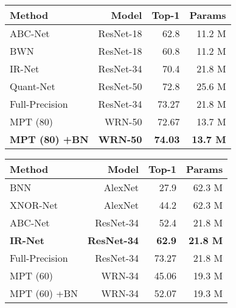 \documentclass{article} \usepackage{iclr2021_conference,times}
\begin{document}
\begin{table*}[h] 
\parbox{.45\linewidth}{
\centering
\begin{small}
\begin{tabular}{@{}lrrr@{}}\toprule
\textbf{Method} & \textbf{Model} & \textbf{Top-1} & \textbf{Params} \\ \midrule
ABC-Net & ResNet-18 & 62.8 & 11.2 M \\ \hdashline
BWN & ResNet-18 & 60.8 & 11.2 M \\ \hdashline
IR-Net & ResNet-34 & 70.4 & 21.8 M \\ \hdashline
Quant-Net & ResNet-50 & 72.8 & 25.6 M \\ \hdashline
Full-Precision & ResNet-34 & 73.27 & 21.8 M \\ \hline
MPT (80) & WRN-50 & 72.67 & 13.7 M \\ \hdashline
\textbf{MPT (80) +BN} &
\textbf{WRN-50} & \textbf{74.03} & \textbf{13.7 M} \\
\bottomrule
\end{tabular}
\end{small}
\vspace{-0.1in}
\caption{Comparison of MPT-1/32 with trained binary-1/32 networks on ImageNet.}
\label{table:imagenet-mpt-1-32}
}
\hspace{.072\linewidth}
\parbox{.45\linewidth}{
\centering
\begin{small}
\begin{tabular}{@{}lrrr@{}}\toprule
\textbf{Method} & \textbf{Model} & \textbf{Top-1} & \textbf{Params} \\ \midrule
BNN & AlexNet & 27.9 & 62.3 M \\ \hdashline
XNOR-Net & AlexNet & 44.2 & 62.3 M\\ \hdashline
ABC-Net & ResNet-34 & 52.4 & 21.8 M \\ \hdashline
\textbf{IR-Net} & \textbf{ResNet-34} & \textbf{62.9} & \textbf{21.8 M} \\ \hdashline
Full-Precision & ResNet-34 & 73.27& 21.8 M\\ \hline
MPT (60) & WRN-34 & 45.06 & 19.3 M \\ \hdashline
MPT (60) +BN & WRN-34 & 52.07 & 19.3 M \\
\bottomrule
\end{tabular}
\end{small}
\vspace{-0.1in}
\caption{Comparison of MPT-1/1 with trained binary-1/1 networks on ImageNet.}
\label{table:imagenet-mpt-1-1}
}
\end{table*}
\vspace{0.1in}
\end{document}
